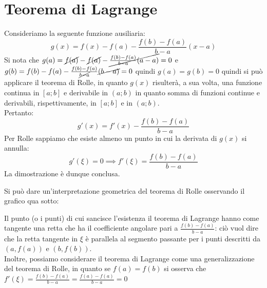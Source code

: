 \documentclass{report}
\begin{document}
\section{Teorema di Lagrange}
\begin{myproof}
Consideriamo la seguente funzione ausiliaria:
$$
	g(x) = f(x)-f(a)-\frac{f(b)-f(a)}{b-a}(x-a)
$$
Si nota che $g(a) = \cancel{f(a)}-\cancel{f(a)} - \cancel{\frac{f(b)-f(a)}{b-a}(a-a)} = 0$ e $g(b)=f(b)-f(a) - \frac{f(b)-f(a)}{\cancel{b-a}}\cancel{(b-a)} = 0$ quindi $g(a)=g(b)=0$ quindi si può applicare il teorema di Rolle, in quanto $g(x)$ risulterà, a sua volta, una funzione continua in $[a;b]$ e derivabile in $(a;b)$ in quanto somma di funzioni continue e derivabili, rispettivamente, in $[a;b]$ e in $(a;b)$. \\
Pertanto:
$$
	g'(x) = f'(x) - \frac{f(b)-f(a)}{b-a}
$$
Per Rolle sappiamo che esiste almeno un punto in cui la derivata di $g(x)$ si annulla:
$$
	g'(\xi) = 0 \implies f'(\xi) = \frac{f(b)-f(a)}{b-a}
$$
La dimostrazione è dunque conclusa.
\end{myproof}
\par\noindent\smallskip Si può dare un'interpretazione geometrica del teorema di Rolle osservando il grafico qua sotto:
\\
\begin{center}
\end{center}
Il punto (o i punti) di cui sancisce l'esistenza il teorema di Lagrange hanno come tangente una retta che ha il coefficiente angolare pari a $\frac{f(b)-f(a)}{b-a}$: ciò vuol dire che la retta tangente in $\xi$ è parallela al segmento passante per i punti descritti da $(a, f(a))$ e $(b, f(b))$. \\
Inoltre, possiamo considerare il teorema di Lagrange come una generalizzazione del teorema di Rolle, in quanto se $f(a) = f(b)$ si osserva che $f'(\xi) = \frac{f(b)-f(a)}{b-a} = \frac{f(a)-f(a)}{b-a} = 0$
\end{document}
